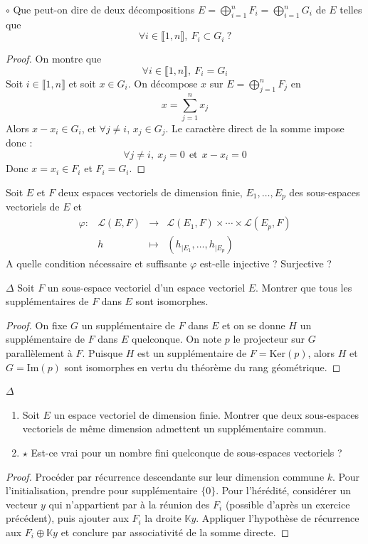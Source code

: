 \documentclass[french,a4paper]{article}
\newcommand{\K}{\mathbb{K}}
\renewcommand{\ker}{\text{Ker}}
\newcommand{\im}{\text{Im}}
\theoremstyle{plain}
\theoremstyle{definition}
\theoremstyle{remark}
\begin{document}
\begin{ex}[Moulin.EV.28]{$\circ$}
	Que peut-on dire de deux décompositions $E=\displaystyle\bigoplus_{i=1}^nF_i=\bigoplus_{i=1}^n G_i$ de $E$ telles que $$\forall i\in\llbracket1,n\rrbracket,\ F_i\subset G_i\ ?$$
\end{ex}
\begin{proof}
	On montre que $$\forall i\in\llbracket1,n\rrbracket,\ F_i=G_i$$ Soit $i\in\llbracket1,n\rrbracket$ et soit $x\in G_i$. On décompose $x$ sur $E=\displaystyle\bigoplus_{j=1}^nF_j$ en $$x=\sum_{j=1}^{n}x_j$$ Alors $x-x_i\in G_i$, et $\forall j\ne i$, $x_j\in G_j$. Le caractère direct de la somme impose donc : $$\forall j\ne i,\ x_j=0\ \ \text{et}\ \ x-x_i=0$$ Donc $x=x_i\in F_i$ et $F_i=G_i$.
\end{proof}

\begin{ex}[Moulin.EV.29]{}
	Soit $E$ et $F$ deux espaces vectoriels de dimension finie, $E_1,\ldots,E_p$ des sous-espaces vectoriels de $E$ et $$\begin{array}{lrcl}
		\varphi:&\mathcal{L}(E,F)&\longrightarrow&\mathcal{L}(E_1,F)\times\cdots\times\mathcal{L}(E_p,F) \\
		&h&\longmapsto&(h_{\mid E_1},\ldots,h_{\mid E_p})
	\end{array}$$ A quelle condition nécessaire et suffisante $\varphi$ est-elle injective ? Surjective ?
\end{ex}

\begin{ex}[Moulin.EV.30]{$\Delta$}
	Soit $F$ un sous-espace vectoriel d'un espace vectoriel $E$. Montrer que tous les supplémentaires de $F$ dans $E$ sont isomorphes.
\end{ex}
\begin{proof}
	On fixe $G$ un supplémentaire de $F$ dans $E$ et on se donne $H$ un supplémentaire de $F$ dans $E$ quelconque. On note $p$ le projecteur sur $G$ parallèlement à $F$. Puisque $H$ est un supplémentaire de $F=\ker(p)$, alors $H$ et $G=\im(p)$ sont isomorphes en vertu du théorème du rang géométrique.
\end{proof}

\begin{ex}[Moulin.EV.31]{$\Delta$}
	\begin{enumerate}
		\item Soit $E$ un espace vectoriel de dimension finie. Montrer que deux sous-espaces vectoriels de même dimension admettent un supplémentaire commun.
		\item $\star$ Est-ce vrai pour un nombre fini quelconque de sous-espaces vectoriels ?
	\end{enumerate}
\end{ex}
\begin{proof}
	Procéder par récurrence descendante sur leur dimension commune $k$. Pour l'initialisation, prendre pour supplémentaire $\{0\}$. Pour l'hérédité, considérer un vecteur $y$ qui n'appartient par à la réunion des $F_i$ (possible d'après un exercice précédent), puis ajouter aux $F_i$ la droite $\K y$. Appliquer l'hypothèse de récurrence aux $F_i\oplus\K y$ et conclure par associativité de la somme directe.
\end{proof}
\end{document}

